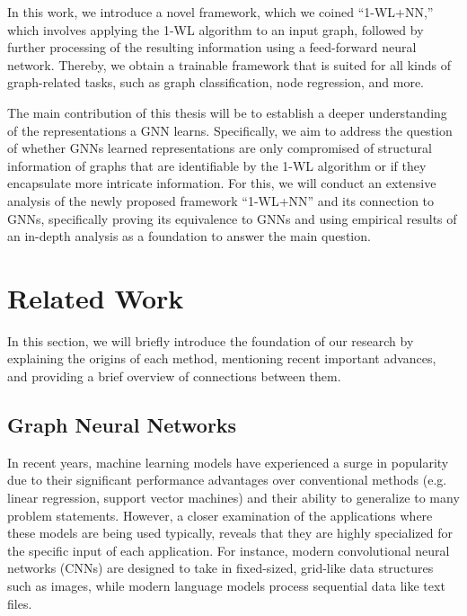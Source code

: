 \documentclass[11pt, dvipsnames, DIV=12]{scrreprt}
\theoremstyle{definition}
\begin{document}
In this work, we introduce a novel framework, which we coined ``1-WL+NN,'' which involves applying the 1-WL algorithm to an input graph, followed by further processing of the resulting information using a feed-forward neural network. Thereby, we obtain a trainable framework that is suited for all kinds of graph-related tasks, such as graph classification, node regression, and more.

The main contribution of this thesis will be to establish a deeper understanding of the representations a GNN learns. Specifically, we aim to address the question of whether GNNs learned representations are only compromised of structural information of graphs that are identifiable by the 1-WL algorithm or if they encapsulate more intricate information.
For this, we will conduct an extensive analysis of the newly proposed framework ``1-WL+NN'' and its connection to GNNs, specifically proving its equivalence to GNNs and using empirical results of an in-depth analysis as a foundation to answer the main question.

\section{Related Work}
In this section, we will briefly introduce the foundation of our research by explaining the origins of each method, mentioning recent important advances, and providing a brief overview of connections between them.

\subsection{Graph Neural Networks}
In recent years, machine learning models have experienced a surge in popularity due to their significant performance advantages over conventional methods (e.g. linear regression, support vector machines) and their ability to generalize to many problem statements. However, a closer examination of the applications where these models are being used typically, reveals that they are highly specialized for the specific input of each application. For instance, modern convolutional neural networks (CNNs) are designed to take in fixed-sized, grid-like data structures such as images, while modern language models process sequential data like text files.
\end{document}
